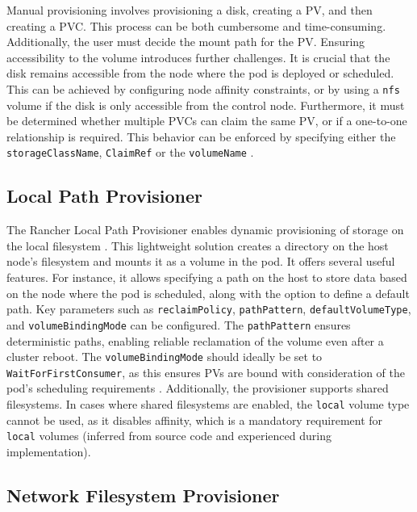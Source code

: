 Manual provisioning involves provisioning a disk, creating a PV, and then creating a PVC. This process can be both cumbersome and time-consuming. Additionally, the user must decide the mount path for the PV. Ensuring accessibility to the volume introduces further challenges. It is crucial that the disk remains accessible from the node where the pod is deployed or scheduled. This can be achieved by configuring node affinity constraints, or by using a \texttt{nfs} volume if the disk is only accessible from the control node. Furthermore, it must be determined whether multiple PVCs can claim the same PV, or if a one-to-one relationship is required. This behavior can be enforced by specifying either the \texttt{storageClassName}, \texttt{ClaimRef} or the \texttt{volumeName} \Parencite{kubernetesPersistentVolumes}.

\subsection{Local Path Provisioner} 

The Rancher Local Path Provisioner enables dynamic provisioning of storage on the local filesystem \Parencite{rancher_local_path_provisioner}. This lightweight solution creates a directory on the host node's filesystem and mounts it as a volume in the pod. It offers several useful features. For instance, it allows specifying a path on the host to store data based on the node where the pod is scheduled, along with the option to define a default path. Key parameters such as \texttt{reclaimPolicy}, \texttt{pathPattern}, \texttt{defaultVolumeType}, and \texttt{volumeBindingMode} can be configured. The \texttt{pathPattern} ensures deterministic paths, enabling reliable reclamation of the volume even after a cluster reboot. The \texttt{volumeBindingMode} should ideally be set to \texttt{WaitForFirstConsumer}, as this ensures PVs are bound with consideration of the pod's scheduling requirements \Parencite{kubernetes_storage_classes}. Additionally, the provisioner supports shared filesystems. In cases where shared filesystems are enabled, the \texttt{local} volume type cannot be used, as it disables affinity, which is a mandatory requirement for \texttt{local} volumes (inferred from source code and experienced during implementation).

\subsection{Network Filesystem Provisioner} 

